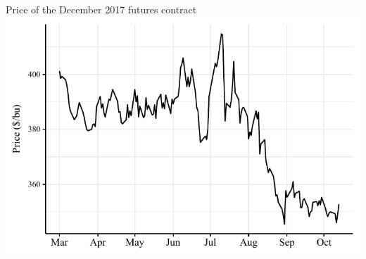 \documentclass[table,xcolor=pdftex,dvipsnames, handout]{beamer}\usepackage[]{graphicx}\usepackage[]{color}
\makeatletter
\def\maxwidth{ %
  \ifdim\Gin@nat@width>\linewidth
    \linewidth
  \else
    \Gin@nat@width
  \fi
}
\newenvironment{knitrout}{}{} %
\makeatother
\begin{document}

\begin{frame}{Price of the December 2017 futures contract}
\begin{knitrout}
\color{fgcolor}
\includegraphics[width=\maxwidth]{figure/figure_corn-1} 

\end{knitrout}
\end{frame}

\end{document}
